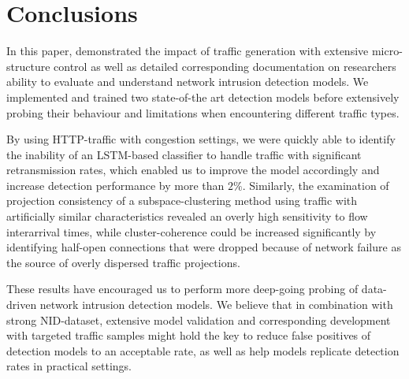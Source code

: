 \documentclass[conference]{IEEEtran}
\begin{document}
\section{Conclusions}\label{Sec:Conclusion}

In this paper, demonstrated the impact of traffic generation with extensive micro-structure control as well as detailed corresponding documentation on researchers ability to evaluate and understand network intrusion detection models. We implemented and trained two state-of-the art detection models before extensively probing their behaviour and limitations when encountering different traffic types. 

By using HTTP-traffic with congestion settings, we were quickly able to identify the inability of an LSTM-based classifier to handle traffic with significant retransmission rates, which enabled us to improve the model accordingly and increase detection performance by more than $2\%$. Similarly, the examination of projection consistency of a subspace-clustering method using traffic with artificially similar characteristics revealed an overly high sensitivity to flow interarrival times, while cluster-coherence could be increased significantly by identifying half-open connections that were dropped because of network failure as the source of overly dispersed traffic projections. 

These results have encouraged us to perform more deep-going probing of data-driven network intrusion detection models. We believe that in combination with strong NID-dataset, extensive model validation and corresponding development with targeted traffic samples might hold the key to reduce false positives of detection models to an acceptable rate, as well as help models replicate detection rates in practical settings.



\end{document}
